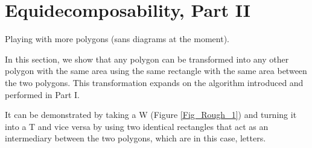\documentclass{article}
\begin{document}
\section{Equidecomposability, Part II}
Playing with more polygons (sans diagrams at the moment).

In this section, we show that any polygon can be transformed into any other polygon with the same area using the same rectangle with the same area between the two polygons. This transformation expands on the algorithm introduced and performed in Part I.

It can be demonstrated by taking a W (Figure \ref{Fig_Rough_1}) and turning it into a T and vice versa by using two identical rectangles that act as an intermediary between the two polygons, which are in this case, letters.

\end{document}
